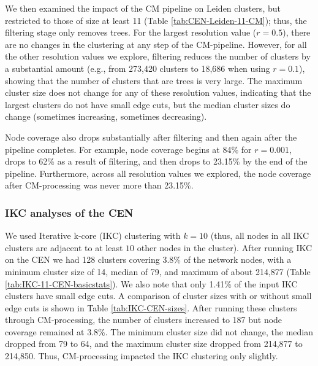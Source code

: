 \documentclass[11pt]{article}   	%
\begin{document}
We then examined the impact of the CM pipeline on Leiden clusters, but restricted to those of size at least 11 (Table \ref{tab:CEN-Leiden-11-CM}); 
thus, the filtering stage only removes trees.
For the largest resolution value ($r=0.5$), there are no changes in the clustering at any step of the CM-pipeline.
However, for all the other resolution values we explore, filtering reduces the number of clusters by a substantial amount (e.g., from 273,420 clusters to 18,686 when using $r=0.1$), showing that the number of clusters that are trees is very large.
The maximum cluster size does not change for any of these resolution values, indicating that the largest clusters do not have small edge cuts,  but the median cluster sizes do change (sometimes increasing, sometimes decreasing).

Node coverage also drops substantially after filtering and then again after the pipeline completes.
For example,
node coverage begins at 84\% for $r=0.001$, drops to 62\% as a result of filtering, and then drops to 23.15\% by the end of the
pipeline.
Furthermore,
across all resolution values we explored, the node coverage after CM-processing was never more than 23.15\%.



\subsubsection{IKC analyses of the CEN}
 
 

We used Iterative k-core (IKC) clustering with $k=10$ (thus, all nodes in all  IKC clusters are adjacent to at least $10$ other nodes in the cluster). 
After running IKC on the CEN we had 128 clusters covering 3.8\% of the network nodes, with a minimum cluster size of 14, median of 79, and maximum of about 214,877 (Table \ref{tab:IKC-11-CEN-basicstats}). 
We also note that  only 1.41\% of the input IKC clusters have small edge cuts.
A comparison of cluster sizes with or without small edge cuts is shown in  Table \ref{tab:IKC-CEN-sizes}.
 After running these clusters through CM-processing, the number of clusters increased to 187 but node coverage remained at 3.8\%.   The  minimum cluster size did not change, the median dropped from 79 to 64, and the maximum cluster size dropped from 214,877 to 214,850. 
 Thus, CM-processing impacted the IKC clustering only slightly.  


\end{document}
